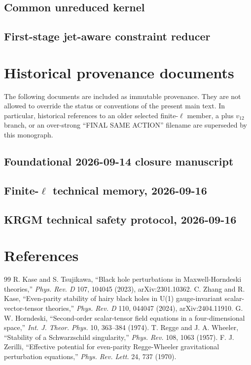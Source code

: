 \documentclass[11pt,a4paper,oneside]{book}
\begin{document}
\section{Common unreduced kernel}

\section{First-stage jet-aware constraint reducer}

\chapter{Historical provenance documents}
The following documents are included as immutable provenance. They are not allowed to override the status or conventions of the present main text. In particular, historical references to an older selected finite-$\ell$ member, a plus $v_{12}$ branch, or an over-strong ``FINAL SAME ACTION'' filename are superseded by this monograph.

\section{Foundational 2026-09-14 closure manuscript}

\section{Finite-$\ell$ technical memory, 2026-09-16}

\section{KRGM technical safety protocol, 2026-09-16}

\backmatter
\chapter{References}
\begin{thebibliography}{99}
 R. Kase and S. Tsujikawa, ``Black hole perturbations in Maxwell-Horndeski theories,'' \emph{Phys. Rev. D} 107, 104045 (2023), arXiv:2301.10362.
 C. Zhang and R. Kase, ``Even-parity stability of hairy black holes in U(1) gauge-invariant scalar-vector-tensor theories,'' \emph{Phys. Rev. D} 110, 044047 (2024), arXiv:2404.11910.
 G. W. Horndeski, ``Second-order scalar-tensor field equations in a four-dimensional space,'' \emph{Int. J. Theor. Phys.} 10, 363--384 (1974).
 T. Regge and J. A. Wheeler, ``Stability of a Schwarzschild singularity,'' \emph{Phys. Rev.} 108, 1063 (1957).
 F. J. Zerilli, ``Effective potential for even-parity Regge-Wheeler gravitational perturbation equations,'' \emph{Phys. Rev. Lett.} 24, 737 (1970).
\end{thebibliography}
\end{document}
